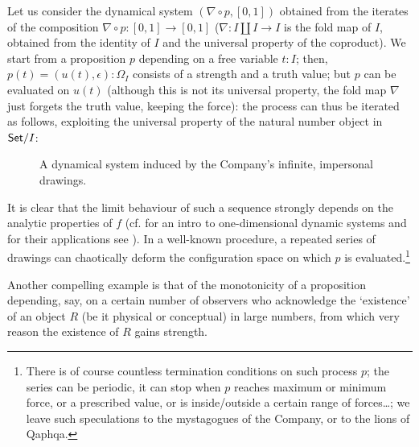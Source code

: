 \begin{example}
  Let us consider the dynamical system $(\nabla\circ p, [0,1])$ obtained from the iterates of the composition $\nabla \circ p : [0,1] \to [0,1]$ ($\nabla : I\amalg I \to I$ is the fold map of $I$, obtained from the identity of $I$ and the universal property of the coproduct). We start from a proposition $p$ depending on a free variable $t : I$; then, $p(t) = (u(t),\epsilon): \Omega_I$ consists of a strength and a truth value; but $p$ can be evaluated on $u(t)$ (although this is not its universal property, the fold map $\nabla$ just forgets the truth value, keeping the force): the process can thus be iterated as follows, exploiting the universal property of the natural number object in $\mathsf{Set}/I$:
  \begin{center}
    \begin{figure}[h]
      \def\line{\draw (0,0) -- (1,0); \draw (0,.5) -- (1,.5);}
      \caption{A dynamical system induced by the Company's infinite, impersonal drawings.}
      \label{fig_dynamics}
    \end{figure}
  \end{center}
  It is clear that the limit behaviour of such a sequence strongly depends on the analytic properties of $f$ (cf. \cite{strogatz1996nonlinear} for an intro to one-dimensional dynamic systems and for their applications see \cite{wiggins2003introduction}). In a well-known procedure, a repeated series of drawings can chaotically deform the configuration space on which $p$ is evaluated.\footnote{There is of course countless termination conditions on such process $p$; the series can be periodic, it can stop when $p$ reaches maximum or minimum force, or a prescribed value, or is inside/outside a certain range of forces\dots; we leave such speculations to the mystagogues of the Company, or to the lions of Qaphqa.}
\end{example}
Another compelling example is that of the monotonicity of a proposition depending, say, on a certain number of observers who acknowledge the `existence' of an object $R$ (be it physical or conceptual) in large numbers, from which very reason the existence of $R$ gains strength.
